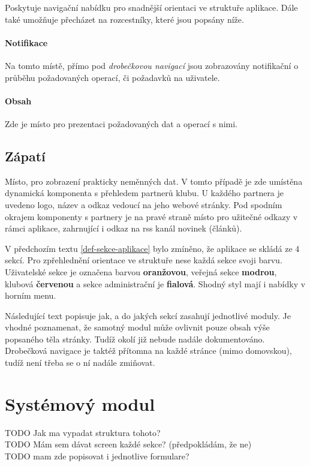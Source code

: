 \documentclass[11pt,oneside]{fithesis}
\begin{document}
            Poskytuje navigační nabídku pro snadnější orientaci ve struktuře aplikace. Dále také umožňuje přecházet na rozcestníky, které jsou popsány níže.

            \paragraph*{Notifikace}
            Na tomto místě, přímo pod \textit{drobečkovou navigací} jsou zobrazovány notifikační  o průběhu požadovaných operací, či požadavků na uživatele.

            \paragraph*{Obsah}

            Zde je místo pro prezentaci požadovaných dat a operací s nimi.

        \subsection{Zápatí}
            Místo, pro zobrazení prakticky neměnných dat. V tomto případě je zde umístěna dynamická komponenta s přehledem partnerů klubu. U každého partnera je uvedeno logo, název a odkaz vedoucí na jeho webové stránky. 
            Pod spodním okrajem komponenty s partnery je na pravé straně místo pro užitečné odkazy v rámci aplikace, zahrnující i odkaz na rss kanál novinek (článků).

            V předchozím textu \ref{def-sekce-aplikace} bylo zmíněno, že aplikace se skládá ze 4 sekcí. Pro zpřehlednění orientace ve struktuře nese každá sekce svoji barvu. Uživatelské sekce je označena barvou \textbf{oranžovou}, veřejná sekce \textbf{modrou}, klubová \textbf{červenou} a sekce administrační je \textbf{fialová}. Shodný styl mají i nabídky v horním menu.

        Následující text popisuje jak, a do jakých sekcí zasahují jednotlivé moduly. Je vhodné poznamenat, že samotný modul může ovlivnit pouze obsah výše popsaného těla stránky. Tudíž okolí již nebude nadále dokumentováno. Drobečková navigace je taktéž přítomna na každé stránce (mimo domovskou), tudíž není třeba se o ní nadále zmiňovat.

        \section{Systémový modul}
        TODO Jak ma vypadat struktura tohoto?\\
        TODO Mám sem dávat screen každé sekce? (předpokládám, že ne)\\
        TODO mam zde popisovat i jednotlive formulare?
\end{document}
